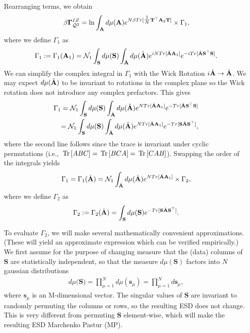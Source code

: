 Rearranging terms, we obtain 
\begin{align}
\label{eqn:IZG_Gamma1}
\beta\mathbf{\Gamma}^{IZ}_{\bar{\mathcal{Q}}^{2}} =  \ln\int_{\mathbf{A}}  d\mu(\mathbf{A}) 
            e^{  N\beta Tr[\tfrac{1}{N} {\mathbf{T}}^{\top}\mathbf{A}_{2}{\mathbf{T}} ] } \times
           \Gamma_1  ,
\end{align}
where we define $\Gamma_1$ as 
\begin{align}
\Gamma_1 := \Gamma_1(\mathbf{A}_{1}) 
         = \mathcal{N}_1 \int_{{\mathbf{S}}} d\mu(\mathbf{S}) 
                           \int_{\hat{\mathbf{A}}} d\mu(\hat{\mathbf{A}}) e^{ iN Tr[ \hat{\mathbf{A}}\mathbf{A}_{1} ] }
                                                           e^{ -i Tr[ \hat{\mathbf{A}}\mathbf{S}^{\top} \mathbf{S} ] } .
\end{align}
We can simplify the complex integral in $\Gamma_1$ with the Wick Rotation $i\hat{\mathbf{A}}\rightarrow\hat{\mathbf{A}}$.
We may expect $d\mu(\hat{\mathbf{A}})$ to be invariant to rotations in the complex plane
so the Wick rotation does not introduce any complex prefactors.  This gives
\begin{eqnarray}
\label{eqn:QWick}
\Gamma_1 = \mathcal{N}_1 \int_{{\mathbf{S}}} d\mu(\mathbf{S})\int_{\hat{\mathbf{A}}} d\mu(\hat{\mathbf{A}}) 
           e^{ N  Tr[ \hat{\mathbf{A}}\mathbf{A}_{1} ] }
           e^{ - Tr[ \hat{\mathbf{A}}\mathbf{S}^{\top} \mathbf{S}] } \\
\label{eqn:QWick2}
         = \mathcal{N}_1 \int_{{\mathbf{S}}} d\mu(\mathbf{S})\int_{\hat{\mathbf{A}}} d\mu(\hat{\mathbf{A}}) 
           e^{ N  Tr[ \hat{\mathbf{A}}\mathbf{A}_{1} ] }
           e^{ -Tr[ \mathbf{S}\hat{\mathbf{A}}\mathbf{S}^{\top} ] } ,
\end{eqnarray}
where the second line follows since the trace is invariant under cyclic permutations (i.e., $\mbox{}\operatorname{Tr}\left[ABC\right]=\mbox{}\operatorname{Tr}\left[BCA\right]=\mbox{}\operatorname{Tr}\left[CAB\right]$).
Swapping the order of the integrals yields
\begin{eqnarray}
\label{eqn:QWick3}
\Gamma_1 =\Gamma_1(\hat{\mathbf{A}})  = \mathcal{N}_1
           \int_{\hat{\mathbf{A}}} d\mu(\hat{\mathbf{A}}) 
           e^{ N Tr[\hat{\mathbf{A}}\mathbf{A}_{1} ]}\times
           \Gamma_2  ,
\end{eqnarray}
where we define $\Gamma_2$ as
\begin{equation*}
\Gamma_2 := \Gamma_2(\hat{\mathbf{A}})
         = \int_{{\mathbf{S}}} d\mu(\mathbf{S})
           e^{ -Tr[ \mathbf{S}\hat{\mathbf{A}}\mathbf{S}^{\top} ] } .
\end{equation*}

To evaluate $\Gamma_2$, we will make several mathematically convenient approximations.
(These will yield an approximate expression which can be verified empirically.)
%
We first assume for the purpose of changing measure that the (data) columns of $\mathbf{S}$ are
statistically independent, so that the measure $d\mu(\mathbf{S})$ factors into $N$ gaussian distributions
\begin{align}
\label{eqn:dMuS}
d\mu(\mathbf{S)} = \prod_{\mu=1}^{N}d\mu(\mathbf{s}_{\mu})=\prod_{\mu=1}^{N}d\mathbf{s}_{\mu} ,
\end{align}
where $\mathbf{s}_{\mu}$ is an M-dimensional vector.
The singular values of $\mathbf{S}$ are invariant to randomly permuting the columns or rows,
so the resulting ESD does not change.  
This is very different from permuting $\mathbf{S}$ element-wise, which will make the resulting ESD Marchenko Pastur (MP).

